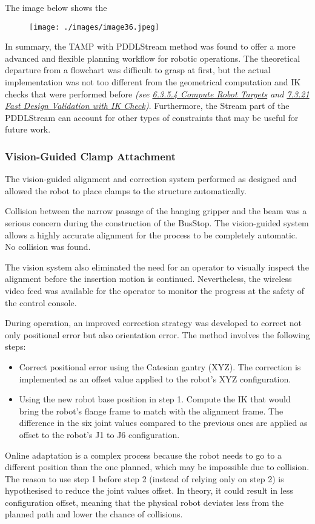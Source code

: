 The image below shows the 

\begin{figure}[H]
\texttt{[image: ./images/image36.jpeg]}
\end{figure}


In summary, the TAMP with PDDLStream method was found to offer a more advanced and flexible planning workflow for robotic operations. The theoretical departure from a flowchart was difficult to grasp at first, but the actual implementation was not too different from the geometrical computation and IK checks that were performed before \textit{(see \uline{6.3.5.4 Compute Robot Targets} and \uline{7.3.21 Fast Design Validation with IK Check})}. Furthermore, the Stream part of the PDDLStream can account for other types of constraints that may be useful for future work. 

\subsubsection{Vision-Guided Clamp Attachment}

The vision-guided alignment and correction system performed as designed and allowed the robot to place clamps to the structure automatically. 

Collision between the narrow passage of the hanging gripper and the beam was a serious concern during the construction of the BusStop. The vision-guided system allows a highly accurate alignment for the process to be completely automatic. No collision was found.

The vision system also eliminated the need for an operator to visually inspect the alignment before the insertion motion is continued. Nevertheless, the wireless video feed was available for the operator to monitor the progress at the safety of the control console.

During operation, an improved correction strategy was developed to correct not only positional error but also orientation error. The method involves the following steps:

\begin{itemize}
	\item Correct positional error using the Catesian gantry (XYZ). The correction is implemented as an offset value applied to the robot’s XYZ configuration.

	\item Using the new robot base position in step 1. Compute the IK that would bring the robot’s flange frame to match with the alignment frame. The difference in the six joint values compared to the previous ones are applied as offset to the robot’s J1 to J6 configuration.

\end{itemize}
Online adaptation is a complex process because the robot needs to go to a different position than the one planned, which may be impossible due to collision. The reason to use step 1 before step 2 (instead of relying only on step 2) is hypothesised to reduce the joint values offset. In theory, it could result in less configuration offset, meaning that the physical robot deviates less from the planned path and lower the chance of collisions. 

